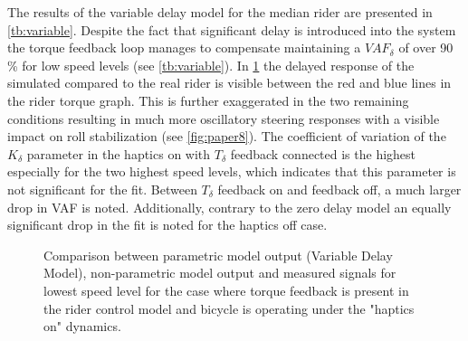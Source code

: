 The results of the variable delay model for the median rider are presented in \cref{tb:variable}.  Despite the fact that significant delay is introduced into the system the torque feedback loop manages to compensate maintaining a \ensuremath{\mathit{VAF}_\delta} of over 90 \% for low speed levels (see \cref{tb:variable}). In \cref{fig:dm_raw} the delayed response of the simulated compared to the real rider is visible between the red and blue lines in the rider torque graph. This is further exaggerated in the two remaining conditions resulting in much more oscillatory steering responses with a visible impact on roll stabilization (see \cref{fig:paper8}). The coefficient of variation of the \ensuremath{K_\delta} parameter in the haptics on with \ensuremath{T_\delta} feedback connected is the highest especially for the two highest speed levels, which indicates that this parameter is not significant for the fit. Between \ensuremath{{T_\delta}} feedback on and feedback off, a much larger drop in VAF is noted. Additionally, contrary to the zero delay model an equally significant drop in the fit is noted for the haptics off case. 






\begin{figure}[!h]
    \centering
        \centering
        \caption{Comparison between parametric model output (Variable Delay Model), non-parametric model output and measured signals for lowest speed level for the case where torque feedback is present in the rider control model and bicycle is operating under the "haptics on" dynamics.}   
        \label{fig:dm_raw}
\end{figure}



